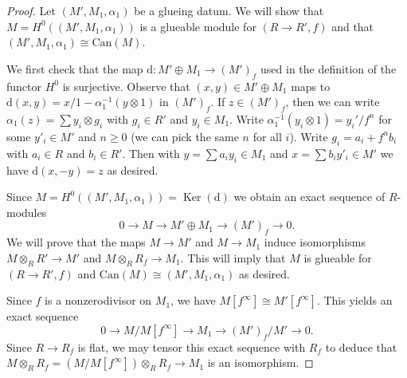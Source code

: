 \documentclass{amsart}
\theoremstyle{plain}
\theoremstyle{definition}
\theoremstyle{remark}
\numberwithin{equation}{subsection}
\def\Ker{\mathop{\mathrm{Ker}}}
\begin{document}
\begin{proof}
Let $(M', M_1, \alpha_1)$ be a glueing datum. We will show that
$M = H^0((M', M_1, \alpha_1))$ is a glueable module for $(R \to R', f)$
and that $(M', M_1, \alpha_1) \cong \text{Can}(M)$.

\medskip\noindent
We first check that the map $\text{d} : M' \oplus M_1 \to (M')_f$ used in the
definition of the functor $H^0$ is surjective. Observe that
$(x, y) \in M' \oplus M_1$ maps to
$\text{d}(x, y) = x/1 - \alpha_1^{-1}(y \otimes 1)$
in $(M')_f$. If $z \in (M')_f$, then we can write
$\alpha_1(z) = \sum y_i \otimes g_i$ with $g_i \in R'$
and $y_i \in M_1$. Write $\alpha_1^{-1}(y_i \otimes 1) = y_i'/f^n$
for some $y'_i \in M'$ and $n \geq 0$ (we can pick the same $n$
for all $i$). Write $g_i = a_i + f^n b_i$ with $a_i \in R$ and
$b_i \in R'$. Then with $y = \sum a_i y_i \in M_1$ and
$x = \sum b_i y'_i \in M'$ we have $\text{d}(x, -y) = z$
as desired.

\medskip\noindent
Since $M = H^0((M', M_1, \alpha_1)) = \Ker(\text{d})$ we obtain
an exact sequence of $R$-modules
\begin{equation}
\label{equation-define-M}
0 \to M \to M' \oplus M_1 \to (M')_f \to 0.
\end{equation}
We will prove that the maps $M \to M'$ and $M \to M_1$ induce isomorphisms
$M \otimes_R R' \to M'$ and $M \otimes_R R_f \to M_1$.
This will imply that $M$ is glueable for $(R \to R', f)$ and
$\text{Can}(M) \cong (M', M_1, \alpha_1)$ as desired.

\medskip\noindent
Since $f$ is a nonzerodivisor on $M_1$, we have
$M[f^\infty] \cong M'[f^\infty]$. This yields an exact sequence
\begin{equation}
\label{equation-exact-mod-torsion}
0 \to M/M[f^\infty] \to M_1 \to (M')_f/M' \to 0.
\end{equation}
Since $R \to R_f$ is flat, we may tensor this exact sequence with $R_f$
to deduce that $M \otimes_R R_f = (M/M[f^\infty]) \otimes_R R_f \to M_1$
is an isomorphism.


\end{proof}
\end{document}
